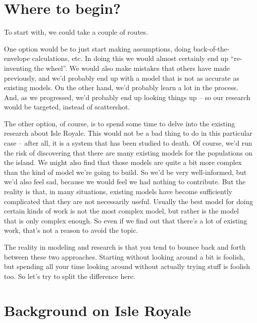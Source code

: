 \documentclass{tufte-handout}
\begin{document}
\section{Where to begin?}
To start with, we could take a couple of routes.  

One option would be to just start making assumptions, doing back-of-the-envelope calculations, etc.  In doing this we would almost certainly end up ``re-inventing the wheel''.  We would also make mistakes that others have made previously, and we'd probably end up with a model that is not as accurate as existing models.  On the other hand, we'd probably learn a lot in the process.    And, as we progressed, we'd probably end up looking things up -- so our research would be targeted, instead of scattershot.  

The other option, of course, is to spend some time to delve into the existing research about Isle Royale.  This would not be a bad thing to do in this particular case -- after all, it is a system that has been studied to death.  Of course, we'd run the risk of discovering that there are many existing models for the populations on the island.  We might also find that those models are quite a bit more complex than the kind of model we're going to build.  So we'd be very well-informed, but we'd also feel sad, because we would feel we had nothing to contribute.  But the reality is that, in many situations, existing models have become sufficiently complicated that they are not necessarily useful.  Usually the best model for doing certain kinds of work is not the most complex model, but rather is the model that is only complex enough.  So even if we find out that there's a lot of existing work, that's not a reason to avoid the topic.

The reality in modeling and research is that you tend to bounce back and forth between these two approaches.  Starting without looking around a bit is foolish, but spending all your time looking around without actually trying stuff is foolish too.  So let's try to split the difference here.

\section{Background on Isle Royale}
\end{document}
